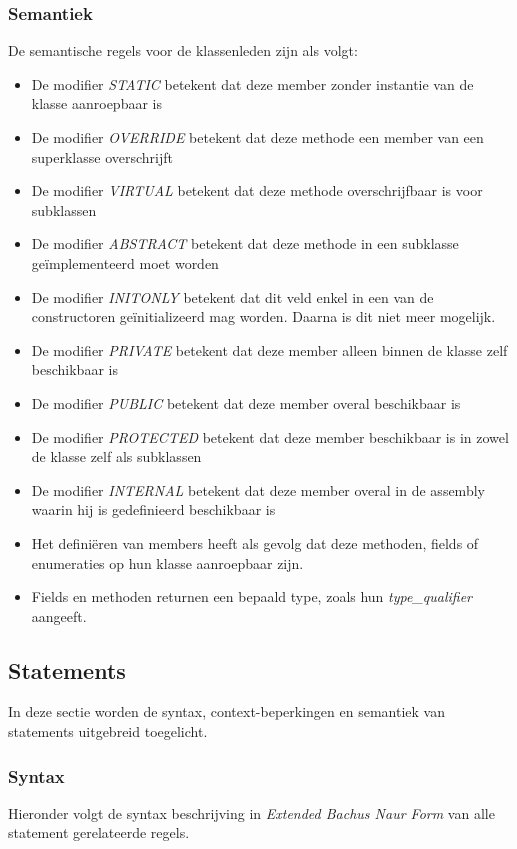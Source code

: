 \subsubsection{Semantiek}
De semantische regels voor de klassenleden zijn als volgt:

\begin{itemize}
	\item De modifier \textit{STATIC} betekent dat deze member zonder instantie van de klasse aanroepbaar is
	\item De modifier \textit{OVERRIDE} betekent dat deze methode een member van een superklasse overschrijft
	\item De modifier \textit{VIRTUAL} betekent dat deze methode overschrijfbaar is voor subklassen
	\item De modifier \textit{ABSTRACT} betekent dat deze methode in een subklasse ge\"implementeerd moet worden
	\item De modifier \textit{INITONLY} betekent dat dit veld enkel in een van de constructoren ge\"initializeerd mag worden. Daarna is dit niet meer mogelijk.
	\item De modifier \textit{PRIVATE} betekent dat deze member alleen binnen de klasse zelf beschikbaar is
	\item De modifier \textit{PUBLIC} betekent dat deze member overal beschikbaar is
	\item De modifier \textit{PROTECTED} betekent dat deze member beschikbaar is in zowel de klasse zelf als subklassen
	\item De modifier \textit{INTERNAL} betekent dat deze member overal in de assembly waarin hij is gedefinieerd beschikbaar is
	\item Het defini\"eren van members heeft als gevolg dat deze methoden, fields of enumeraties op hun klasse aanroepbaar zijn.
	\item Fields en methoden returnen een bepaald type, zoals hun \textit{type\_qualifier} aangeeft.
\end{itemize}

\subsection{Statements}
In deze sectie worden de syntax, context-beperkingen en semantiek van statements uitgebreid toegelicht.

\subsubsection{Syntax}
Hieronder volgt de syntax beschrijving in \textit{Extended Bachus Naur Form} van alle statement gerelateerde regels.

